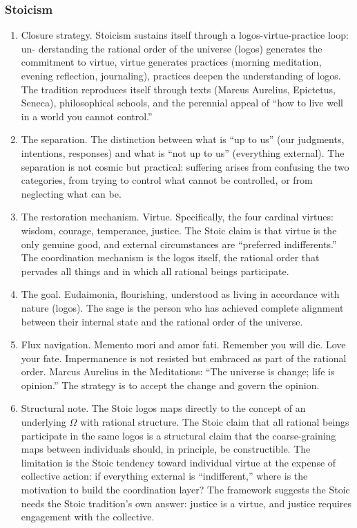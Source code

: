 \documentclass[
]{article}
\begin{document}
\subsubsection{Stoicism}\label{stoicism}

\begin{enumerate}
\def\labelenumi{\arabic{enumi}.}
\setcounter{enumi}{117}
\item
  Closure strategy. Stoicism sustains itself through a
  logos-virtue-practice loop: un- derstanding the rational order of the
  universe (logos) generates the commitment to virtue, virtue generates
  practices (morning meditation, evening reflection, journaling),
  practices deepen the understanding of logos. The tradition reproduces
  itself through texts (Marcus Aurelius, Epictetus, Seneca),
  philosophical schools, and the perennial appeal of ``how to live well
  in a world you cannot control.''
\item
  The separation. The distinction between what is ``up to us'' (our
  judgments, intentions, responses) and what is ``not up to us''
  (everything external). The separation is not cosmic but practical:
  suffering arises from confusing the two categories, from trying to
  control what cannot be controlled, or from neglecting what can be.
\item
  The restoration mechanism. Virtue. Specifically, the four cardinal
  virtues: wisdom, courage, temperance, justice. The Stoic claim is that
  virtue is the only genuine good, and external circumstances are
  ``preferred indifferents.'' The coordination mechanism is the logos
  itself, the rational order that pervades all things and in which all
  rational beings participate.
\item
  The goal. Eudaimonia, flourishing, understood as living in accordance
  with nature (logos). The sage is the person who has achieved complete
  alignment between their internal state and the rational order of the
  universe.
\item
  Flux navigation. Memento mori and amor fati. Remember you will die.
  Love your fate. Impermanence is not resisted but embraced as part of
  the rational order. Marcus Aurelius in the Meditations: ``The universe
  is change; life is opinion.'' The strategy is to accept the change and
  govern the opinion.
\item
  Structural note. The Stoic logos maps directly to the concept of an
  underlying \(\Omega\) with rational structure. The Stoic claim that
  all rational beings participate in the same logos is a structural
  claim that the coarse-graining maps between individuals should, in
  principle, be constructible. The limitation is the Stoic tendency
  toward individual virtue at the expense of collective action: if
  everything external is ``indifferent,'' where is the motivation to
  build the coordination layer? The framework suggests the Stoic needs
  the Stoic tradition's own answer: justice is a virtue, and justice
  requires engagement with the collective.
\end{enumerate}
\end{document}
